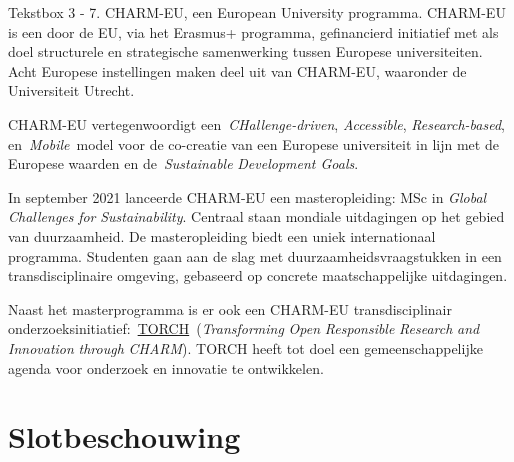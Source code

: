 \documentclass[smallauthor, chapterhaspagenum, nochapterinheader, pagenuminheader,  bigchapnum,medium2, tocpages,  garamond, titleinheader]{jote-book}
\begin{document}
	\begin{bookbox}{Tekstbox 3 - 7. CHARM-EU, een European University programma.}
		CHARM-EU is een door de EU, via het Erasmus+ programma, gefinancierd initiatief met als doel structurele en strategische samenwerking tussen Europese universiteiten. Acht Europese instellingen maken deel uit van CHARM-EU, waaronder de Universiteit Utrecht.

		\vspace*{\baselineskip}

		CHARM-EU vertegenwoordigt een \emph{CH}\emph{allenge-driven}, \emph{A}\emph{ccessible}, \emph{R}\emph{esearch-}\emph{based}, en \emph{M}\emph{obile} model voor de co-creatie van een Europese universiteit in lijn met de Europese waarden en de \emph{Sustainable}\emph{ Development Goals}.

		\vspace*{\baselineskip}

		In september 2021 lanceerde CHARM-EU een masteropleiding: MSc in \emph{Global }\emph{Challenges}\emph{ }\emph{for}\emph{ }\emph{Sustainability}. Centraal staan mondiale uitdagingen op het gebied van duurzaamheid. De masteropleiding biedt een uniek internationaal programma. Studenten gaan aan de slag met duurzaamheidsvraagstukken in een transdisciplinaire omgeving, gebaseerd op concrete maatschappelijke uitdagingen.

		\vspace*{\baselineskip}

		Naast het masterprogramma is er ook een CHARM-EU transdisciplinair onderzoeksinitiatief: \href{https://www.charm-eu.eu/torch}{TORCH} (\emph{Transforming}\emph{ Open }\emph{Responsible}\emph{ Research }\emph{and}\emph{ }\emph{Innovation}\emph{ }\emph{through}\emph{ CHARM}). TORCH heeft tot doel een gemeenschappelijke agenda voor onderzoek en innovatie te ontwikkelen.
	\end{bookbox}

	\section{Slotbeschouwing}
\end{document}
